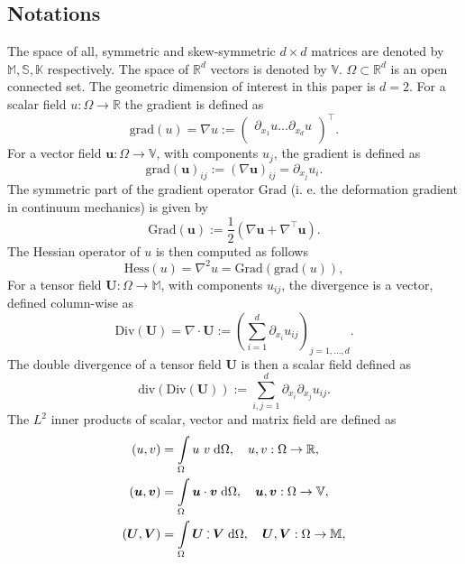 \documentclass{ifacconf}
\def\onedot{$\mathsurround0pt\ldotp$}
\def\cddot{%
	\mathbin{\vcenter{\baselineskip.67ex
			\hbox{\onedot}\hbox{\onedot}}%
}}
\begin{document}
\subsection{Notations}
The space of all, symmetric and skew-symmetric $d\times d$ matrices are denoted by $\mathbb{M}, \mathbb{S}, \mathbb{K}$ respectively. The space of $\mathbb{R}^d$ vectors is denoted by $\mathbb{V}$. $\Omega \subset \mathbb{R}^d$ is an open connected set. The geometric dimension of interest in this paper is $d=2$. For a scalar field $u: \Omega \rightarrow \mathbb{R}$ the gradient is defined as 
\begin{equation*}
\mathrm{grad}(u) =  \nabla u := \begin{pmatrix}
\partial_{x_1} u \dots \partial_{x_d} u \\
\end{pmatrix}^\top.
\end{equation*}
For a vector field $\bm{u}: \Omega \rightarrow \mathbb{V}$, with components $u_j$, the gradient is defined as
\begin{equation*}
\mathrm{grad}(\bm{u})_{i j}:= (\nabla \bm{u})_{ij} = \partial_{x_j} u_i.
\end{equation*}
The symmetric part of the gradient operator $\mathrm{Grad}$ (i. e. the deformation gradient in continuum mechanics) is given by
\begin{equation*}
\mathrm{Grad}(\bm{u}) := \frac{1}{2} \left(\nabla \bm{u} + \nabla^\top \bm{u} \right).
\end{equation*}
The Hessian operator of $u$ is then computed as follows
\begin{equation*}
\mathrm{Hess}(u) = \nabla^2 u = \mathrm{Grad}(\mathrm{grad}(u)),
\end{equation*}
For a tensor field $\bm{U}: \Omega \rightarrow \mathbb{M}$, with components $u_{ij}$, the divergence is a vector, defined column-wise as
\begin{equation*}
\mathrm{Div}(\bm U) = \nabla \cdot \bm{U} := \left( \sum_{i = 1}^d \partial_{x_i} u_{ij} \right)_{j = 1, \dots, d}.
\end{equation*}
The double divergence of a tensor field $\bm{U}$ is then a scalar field defined as
\begin{equation*}
\mathrm{div}(\mathrm{Div}(\bm U)):= \sum_{i, j = 1}^d \partial_{x_i} \partial_{x_j} u_{ij}.
\end{equation*}
The $L^2$ inner products of scalar, vector and matrix field are defined as
\begin{align*}
	(u, v) &= \int_{\Omega} u \ v \d\Omega, \quad u, v : \Omega \rightarrow \mathbb{R}, \\
	(\bm{u}, \bm{v}) &= \int_{\Omega} \bm{u} \cdot \bm{v} \d\Omega, \quad \bm{u}, \bm{v} : \Omega \rightarrow \mathbb{V}, \\
	(\bm{U}, \bm{V}) &= \int_{\Omega} \bm{U} \cddot \bm{V} \d\Omega, \quad \bm{U}, \bm{V} : \Omega \rightarrow \mathbb{M},
\end{align*}
\end{document}
